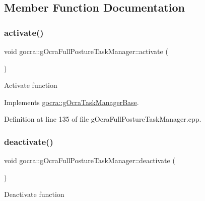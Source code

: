 \subsection{Member Function Documentation}
\hypertarget{classgocra_1_1gOcraFullPostureTaskManager_a24c2b63ff065c8d7b056ccadddf55b59}{}\label{classgocra_1_1gOcraFullPostureTaskManager_a24c2b63ff065c8d7b056ccadddf55b59} 
\subsubsection{\texorpdfstring{activate()}{activate()}}
{\footnotesize\ttfamily void gocra\+::g\+Ocra\+Full\+Posture\+Task\+Manager\+::activate (\begin{DoxyParamCaption}{ }\end{DoxyParamCaption})\hspace{0.3cm}{\ttfamily [virtual]}}

Activate function 

Implements \hyperlink{classgocra_1_1gOcraTaskManagerBase_a50cf1c408749d6e9dcfaf50bcab77dee}{gocra\+::g\+Ocra\+Task\+Manager\+Base}.



Definition at line 135 of file g\+Ocra\+Full\+Posture\+Task\+Manager.\+cpp.

\hypertarget{classgocra_1_1gOcraFullPostureTaskManager_aa53994ddf44ba5d9768ea3d3e5ba9931}{}\label{classgocra_1_1gOcraFullPostureTaskManager_aa53994ddf44ba5d9768ea3d3e5ba9931} 
\subsubsection{\texorpdfstring{deactivate()}{deactivate()}}
{\footnotesize\ttfamily void gocra\+::g\+Ocra\+Full\+Posture\+Task\+Manager\+::deactivate (\begin{DoxyParamCaption}{ }\end{DoxyParamCaption})\hspace{0.3cm}{\ttfamily [virtual]}}

Deactivate function 

